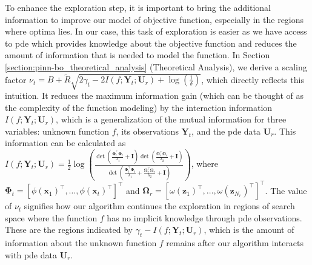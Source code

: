 To enhance the exploration step, it is important to bring the additional information to improve our model of objective function, especially in the regions where optima lies. In our case, this task of exploration is easier as we have access to \ac{pde} which provides knowledge about the objective function and reduces the amount of information that is needed to model the function. In Section \ref{section:pinn-bo_theoretical_analysis} (Theoretical Analysis), we derive a scaling factor $\nu_t = B + \widetilde{R} \sqrt{2\gamma_t - 2 I(f; \mathbf{Y}_t; \mathbf{U}_r)  + \log(\frac{1}{\delta})}$,  which directly reflects this intuition. It reduces the maximum information gain  (which can be thought of as the complexity of the function modeling) by the interaction information $I(f; \mathbf{Y}_t; \mathbf{U}_r)$, which is a generalization of the mutual information for three variables: unknown function $f$,  its observations $\mathbf{Y}_t$, and the \ac{pde} data $\mathbf{U}_r$. This information can be calculated as $I(f; \mathbf{Y}_t; \mathbf{U}_r) = \frac{1}{2}  \log (\frac{\det(\frac{\boldsymbol{\Phi}_t^\top \boldsymbol{\Phi}_t}{\lambda_1} + \mathbf{I})\det(\frac{\boldsymbol{\Omega}_r^\top \boldsymbol{\Omega}_r}{\lambda_2} + \mathbf{I})}{\det(\frac{\boldsymbol{\Phi}_t^\top \boldsymbol{\Phi}_t}{\lambda_1} + \frac{\boldsymbol{\Omega}_r^\top \boldsymbol{\Omega}_r}{\lambda_2} + \mathbf{I})}) $, where $\boldsymbol{\Phi}_t  = [\phi(\mathbf{x}_1)^\top,\dots, \phi(\mathbf{x}_t)^\top ] ^\top$ and 
$\boldsymbol{\Omega}_r  = [\omega(\mathbf{z}_1)^\top, \dots, \omega(\mathbf{z}_{N_r})^\top ] ^\top$. The value of $\nu_t$ signifies how our algorithm continues the exploration in regions of search space where the function $f$ has no implicit knowledge through \ac{pde} observations. These are the regions indicated by $\gamma_t - I(f; \mathbf{Y}_t; \mathbf{U}_r)$, which is the amount of information about the unknown function $f$ remains after our algorithm interacts with \ac{pde} data $\mathbf{U}_r$.  

